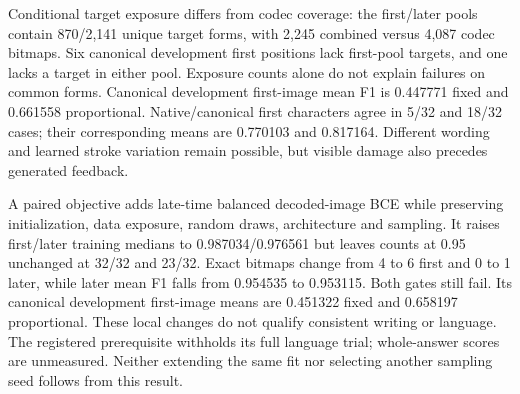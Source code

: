 Conditional target exposure differs from codec coverage: the first/later
pools contain 870/2,141 unique target forms, with 2,245 combined versus 4,087
codec bitmaps. Six canonical development first positions lack first-pool
targets, and one lacks a target in either pool. Exposure counts alone do not
explain failures on common forms. Canonical development first-image mean F1
is 0.447771 fixed and 0.661558 proportional. Native/canonical first characters
agree in 5/32 and 18/32 cases; their corresponding means are 0.770103 and
0.817164. Different wording and learned stroke variation remain possible,
but visible damage also precedes generated feedback.

A paired objective adds late-time balanced decoded-image BCE while preserving
initialization, data exposure, random draws, architecture and sampling. It
raises first/later training medians to 0.987034/0.976561 but leaves counts at
0.95 unchanged at 32/32 and 23/32. Exact bitmaps change from 4 to 6 first
and 0 to 1 later, while later mean F1 falls from 0.954535 to 0.953115.
Both gates still fail. Its canonical development first-image means are
0.451322 fixed and 0.658197 proportional. These local changes do not qualify
consistent writing or language. The registered prerequisite withholds its
full language trial; whole-answer scores are unmeasured. Neither extending
the same fit nor selecting another sampling seed follows from this result.



